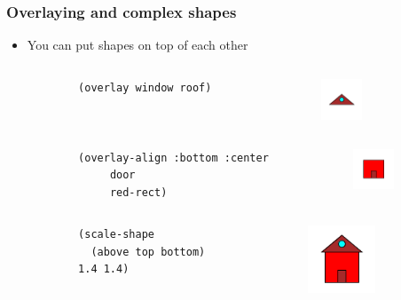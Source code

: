 \documentclass{beamer}
\begin{document}
\begin{frame}[fragile]
	\frametitle{Overlaying and complex shapes}
	\begin{itemize}
	\item You can put shapes on top of each other 
	\begin{columns}[t]
		\begin{column}{.45\textwidth}
		\begin{verbatim}
		(overlay window roof)
		\end{verbatim}
		\end{column}
		\begin{column}{.3\textwidth}
		\begin{figure}[h]
			\includegraphics[width=1.22cm]{PresentationImages/roof.png}
			\end{figure}		
		\end{column}
		\end{columns} 
		\begin{columns}[t]
		\begin{column}{.45\textwidth}
		\begin{verbatim}
		(overlay-align :bottom :center 
		     door 
		     red-rect)
		\end{verbatim}
		\end{column}
		\begin{column}{.3\textwidth}
		\begin{figure}[h]
			\includegraphics[width=1.2cm]{PresentationImages/body.png}
			\end{figure}		
		\end{column}
		\end{columns} 
		\begin{columns}[t]
		\begin{column}{.45\textwidth}
		\begin{verbatim}
		(scale-shape 
		  (above top bottom) 
		1.4 1.4)

		\end{verbatim}
		\end{column}
		\begin{column}{.3\textwidth}
		\begin{figure}[h]
			\includegraphics[width=2cm]{PresentationImages/house.png}
			\end{figure}		
		\end{column}
		\end{columns}
	\end{itemize}
	
\end{frame}
\end{document}
